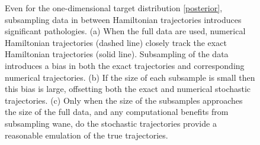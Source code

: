 \documentclass{article}
\begin{document}
\begin{figure}
\centering
{}
\caption{Even for the one-dimensional target distribution \eqref{posterior}, subsampling
data in between Hamiltonian trajectories introduces significant pathologies.
(a) When the full data are used, numerical Hamiltonian trajectories (dashed line) 
closely track the exact Hamiltonian trajectories (solid line).  Subsampling of the
data introduces a bias in both the exact trajectories and corresponding
numerical trajectories.  (b) If the size of each subsample is small then this bias 
is large, offsetting both the exact and numerical stochastic trajectories. 
(c) Only when the size of the subsamples approaches the size of the full data, 
and any computational benefits from subsampling wane, do the stochastic 
trajectories provide a reasonable emulation of the true trajectories.}
\label{fig:level_sets}
\end{figure}
\end{document}
